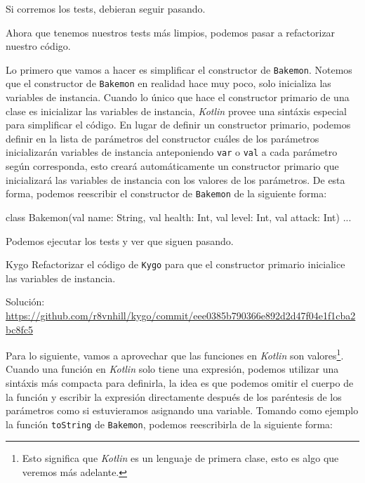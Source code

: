   Si corremos los tests, debieran seguir pasando.

  Ahora que tenemos nuestros tests más limpios, podemos pasar a refactorizar nuestro código.

  Lo primero que vamos a hacer es simplificar el constructor de \texttt{Bakemon}.
  Notemos que el constructor de \texttt{Bakemon} en realidad hace muy poco, solo inicializa las
  variables de instancia.
  Cuando lo único que hace el constructor primario de una clase es 
  inicializar las variables de instancia, \textit{Kotlin} provee una sintáxis especial para 
  simplificar el código.
  En lugar de definir un constructor primario, podemos definir en la lista de parámetros del
  constructor cuáles de los parámetros inicializarán variables de instancia anteponiendo 
  \texttt{var} o \texttt{val} a cada parámetro según corresponda, esto creará automáticamente
  un constructor primario que inicializará las variables de instancia con los valores de los
  parámetros.
  De esta forma, podemos reescribir el constructor de \texttt{Bakemon} de la siguiente forma:

  \begin{kotlin}
    class Bakemon(val name: String, val health: Int, val level: Int, val attack: Int) {...}
  \end{kotlin}

  Podemos ejecutar los tests y ver que siguen pasando.

  \begin{ejercicio}{Kygo}
    Refactorizar el código de \texttt{Kygo} para que el constructor primario inicialice las
    variables de instancia.

    {\footnotesize
      Solución: \url{https://github.com/r8vnhill/kygo/commit/eee0385b790366e892d2d47f04e1f1cba2bc8fc5}
    }
  \end{ejercicio}

  Para lo siguiente, vamos a aprovechar que las funciones en \textit{Kotlin} son valores\footnote{
    Esto significa que \textit{Kotlin} es un lenguaje de primera clase, esto es algo que veremos
    más adelante.
  }.
  Cuando una función en \textit{Kotlin} solo tiene una expresión, podemos utilizar una sintáxis más
  compacta para definirla, la idea es que podemos omitir el cuerpo de la función y escribir la expresión
  directamente después de los paréntesis de los parámetros como si estuvieramos asignando una 
  variable.
  Tomando como ejemplo la función \texttt{toString} de \texttt{Bakemon}, podemos reescribirla de la
  siguiente forma:

